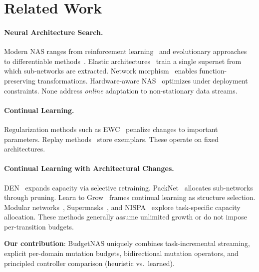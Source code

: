 \documentclass[10pt,twocolumn,letterpaper]{article}
\begin{document}
\section{Related Work}
\label{sec:related}

\paragraph{Neural Architecture Search.}
Modern NAS ranges from reinforcement learning~\cite{zoph2017neural,pham2018enas} and evolutionary approaches~\cite{elsken2019lemonade} to differentiable methods~\cite{liu2019darts,cai2019proxylessnas}. Elastic architectures~\cite{cai2020once,yu2019slimmable} train a single supernet from which sub-networks are extracted. Network morphism~\cite{wei2016morphism,chen2016net2net} enables function-preserving transformations. Hardware-aware NAS~\cite{tan2019mnasnet,wu2019fbnet,yang2018netadapt,tan2019efficientnet} optimizes under deployment constraints. None address \emph{online} adaptation to non-stationary data streams.

\paragraph{Continual Learning.}
Regularization methods such as EWC~\cite{kirkpatrick2017ewc} penalize changes to important parameters. Replay methods~\cite{chaudhry2019er,lopez2017gem} store exemplars. These operate on fixed architectures.

\paragraph{Continual Learning with Architectural Changes.}
DEN~\cite{yoon2018lifelong} expands capacity via selective retraining. PackNet~\cite{mallya2018packnet} allocates sub-networks through pruning. Learn to Grow~\cite{li2019learn} frames continual learning as structure selection. Modular networks~\cite{veniat2021efficient}, Supermasks~\cite{wortsman2020supermasks}, and NISPA~\cite{gurbuz2022nispa} explore task-specific capacity allocation. These methods generally assume unlimited growth or do not impose per-transition budgets.

\textbf{Our contribution}: BudgetNAS uniquely combines task-incremental streaming, explicit per-domain mutation budgets, bidirectional mutation operators, and principled controller comparison (heuristic vs.\ learned).
\end{document}
